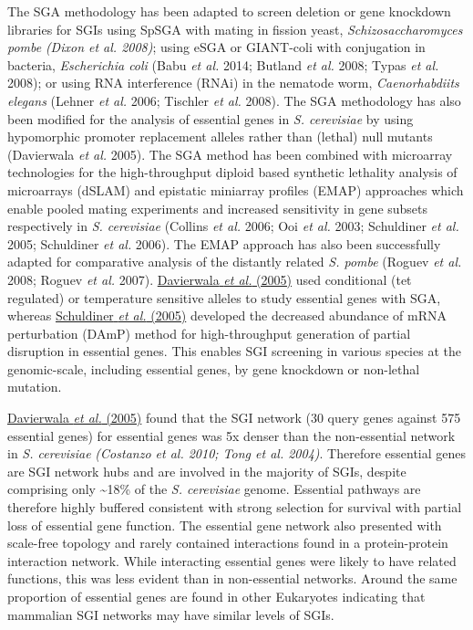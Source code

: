 The SGA methodology has been adapted to screen deletion or gene
knockdown libraries for SGIs using SpSGA with mating in fission yeast,
\textit{Schizosaccharomyces pombe }\textit{(Dixon et al. 2008)}; using
eSGA or GIANT-coli with conjugation in bacteria, \textit{Escherichia
coli} (Babu\textit{ et al.} 2014; Butland\textit{ et al.} 2008;
Typas\textit{ et al.} 2008); or using RNA interference (RNAi) in the
nematode worm, \textit{Caenorhabdiits elegans} (Lehner\textit{ et al.}
2006; Tischler\textit{ et al.} 2008). The SGA methodology has also
been modified for the analysis of essential genes in \textit{S.
cerevisiae} by using hypomorphic promoter replacement alleles rather
than (lethal) null mutants (Davierwala\textit{ et al.} 2005). The SGA
method has been combined with microarray technologies for the
high-throughput diploid based synthetic lethality analysis of
microarrays (dSLAM) and epistatic miniarray profiles (EMAP) approaches
which enable pooled mating experiments and increased sensitivity in
gene subsets respectively in \textit{S. cerevisiae} (Collins\textit{ et
al.} 2006; Ooi\textit{ et al.} 2003; Schuldiner\textit{ et al.} 2005;
Schuldiner\textit{ et al.} 2006). The EMAP approach has also been
successfully adapted for comparative analysis of the distantly related
\textit{S. pombe} (Roguev\textit{ et al.} 2008; Roguev\textit{ et al.}
2007). \hyperlink{ENREF28}{Davierwala}\hyperlink{ENREF28}{\textit{ et
al.}}\hyperlink{ENREF28}{ (2005)} used conditional (tet regulated) or
temperature sensitive alleles to study essential genes with SGA,
whereas \hyperlink{ENREF87}{Schuldiner}\hyperlink{ENREF87}{\textit{ et
al.}}\hyperlink{ENREF87}{ (2005)} developed the decreased abundance of
mRNA perturbation (DAmP) method for high-throughput generation of
partial disruption in essential genes. This enables SGI screening in
various species at the genomic-scale, including essential genes, by
gene knockdown or non-lethal mutation. 


\hyperlink{ENREF28}{Davierwala}\hyperlink{ENREF28}{\textit{ et
al.}}\hyperlink{ENREF28}{ (2005)} found that the SGI network (30 query
genes against 575 essential genes) for essential genes was 5x denser
than the non-essential network in \textit{S. cerevisiae
}\textit{(Costanzo et al. 2010; Tong et al. 2004)}. Therefore
essential genes are SGI network hubs and are involved in the majority
of SGIs, despite comprising only \~{}18\% of the \textit{S. cerevisiae}
genome. Essential pathways are therefore highly buffered consistent
with strong selection for survival with partial loss of essential gene
function. The essential gene network also presented with scale-free
topology and rarely contained interactions found in a protein-protein
interaction network. While interacting essential genes were likely to
have related functions, this was less evident than in non-essential
networks. Around the same proportion of essential genes are found in
other Eukaryotes indicating that mammalian SGI networks may have
similar levels of SGIs. 


